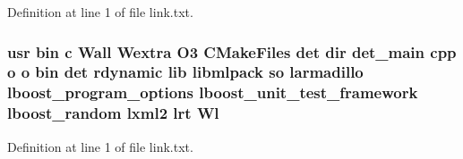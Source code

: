 Definition at line 1 of file link.\-txt.

\subsubsection[{Wl}]{\setlength{\rightskip}{0pt plus 5cm}usr bin c Wall Wextra O3 C\-Make\-Files det dir det\-\_\-main cpp o o bin det rdynamic lib libmlpack so larmadillo lboost\-\_\-program\-\_\-options lboost\-\_\-unit\-\_\-test\-\_\-framework lboost\-\_\-random lxml2 lrt Wl}\label{methods_2det_2CMakeFiles_2det_8dir_2link_8txt_a52653f858cb33fd31dddd244febee5bb}


Definition at line 1 of file link.\-txt.

